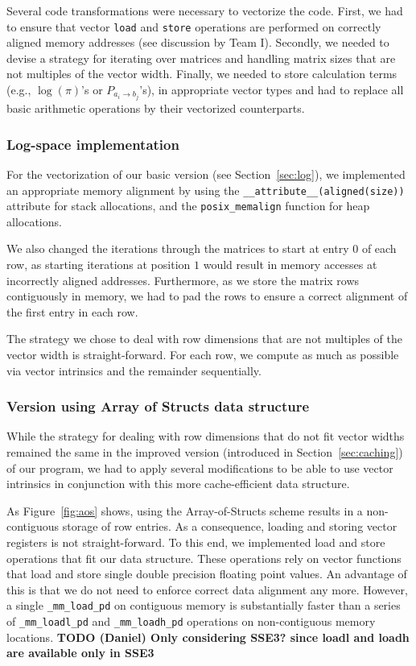 \documentclass[runningheads,a4paper]{llncs}
\begin{document}
Several code transformations were necessary to vectorize the code. 
First, we had to ensure that vector \texttt{load} and \texttt{store} operations are performed on correctly aligned memory addresses (see discussion by Team I). 
Secondly, we needed to devise a strategy for iterating over matrices and handling matrix sizes that are not multiples of the vector width.
Finally, we needed to store calculation terms (e.g., $\log(\pi)$'s or $P_{a_i \to b_j}$'s), in appropriate vector types and 
had to replace all basic arithmetic operations by their vectorized counterparts.

\subsubsection{Log-space implementation}
For the vectorization of our basic version (see Section~\ref{sec:log}), we implemented an appropriate memory alignment 
by using the \texttt{\_\_attribute\_\_(aligned(\texttt{size}))} attribute for stack allocations, 
and the \texttt{posix\_memalign} function for heap allocations.

We also changed the iterations through the matrices to start at entry $0$ of each row, as starting iterations at position $1$ 
would result in memory accesses at incorrectly aligned addresses. 
Furthermore, as we store the matrix rows contiguously in memory, 
we had to pad the rows to ensure a correct alignment of the first entry in each row.

The strategy we chose to deal with row dimensions that are not multiples of the vector width is straight-forward. 
For each row, we compute as much as possible via vector intrinsics and the remainder sequentially. 

\subsubsection{Version using Array of Structs data structure}
While the strategy for dealing with row dimensions that do not fit vector widths remained the same in the improved version (introduced in Section~\ref{sec:caching}) of our program, 
we had to apply several modifications to be able to use vector intrinsics in conjunction with this more cache-efficient data structure.

As Figure~\ref{fig:aos} shows, using the Array-of-Structs scheme results in a non-contiguous storage of row entries. 
As a consequence, loading and storing vector registers is not straight-forward. 
To this end, we implemented load and store operations that fit our data structure. 
These operations rely on vector functions that load and store single double precision floating point values. 
An advantage of this is that we do not need to enforce correct data alignment any more. 
However, a single  \texttt{\_mm\_load\_pd} on contiguous memory is substantially faster than a series of \texttt{\_mm\_loadl\_pd} and \texttt{\_mm\_loadh\_pd} operations
on non-contiguous memory locations. {\bf TODO (Daniel) Only considering SSE3? since loadl and loadh are available only in SSE3}
\end{document}
